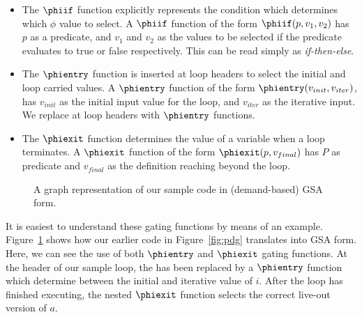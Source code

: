 \begin{itemize}
\item The $\phiif$ function explicitly represents the condition which determines which $\phi$ value to select. 
  A $\phiif$ function of the form $\phiif(p,v_{1},v_{2})$ has $p$ as a predicate, and $v_{1}$ and $v_{2}$ as the values to be selected if the predicate evaluates to true or false respectively. 
  This can be read simply as \textit{if-then-else}.
\item The $\phientry$ function is inserted at loop headers to select the initial and loop carried values. A $\phientry$ function of the form $\phientry(v_{init},v_{iter})$, has $v_{init}$ as the initial input value for the loop, and $v_{iter}$ as the iterative input. We replace \phifuns at loop headers with $\phientry$ functions.
\item The $\phiexit$ function determines the value of a variable when a loop terminates. 
  A $\phiexit$ function of the form $\phiexit(p,v_{final})$ has $P$ as predicate and $v_{final}$ as the definition reaching beyond the loop.
\end{itemize}

\begin{figure}
\centering
{}
\caption{A graph representation of our sample code in (demand-based) GSA form.}
\label{fig:gsa-graph-example}
\end{figure}

It is easiest to understand these gating functions by means of an example. 
Figure~\ref{fig:gsa-graph-example} shows how our earlier code in Figure~\ref{fig:pdg} translates into GSA form. 
Here, we can see the use of both $\phientry$ and $\phiexit$ gating functions. 
At the header of our sample loop, the \phifun has been replaced by a $\phientry$ function which determine between the initial and iterative value of $i$. 
After the loop has finished executing, the nested $\phiexit$ function selects the correct live-out version of $a$.

